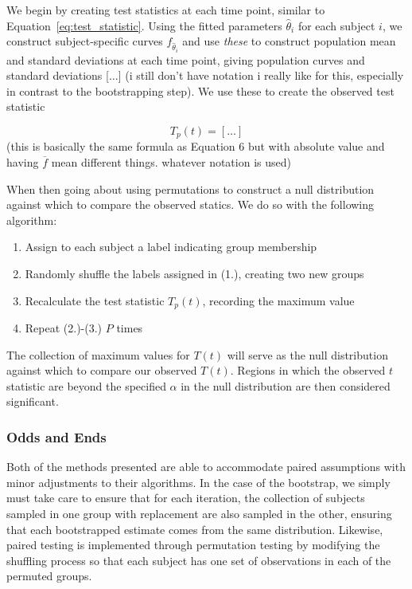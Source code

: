 We begin by creating test statistics at each time point, similar to Equation~\ref{eq:test_statistic}. Using the fitted parameters $\hat{\theta}_i$ for each subject $i$, we construct subject-specific curves $f_{\hat{\theta}_i}$ and use \textit{these} to construct population mean and standard deviations at each time point, giving population curves and standard deviations [$\dots$] (i still don't have notation i really like for this, especially in contrast to the bootstrapping step). We use these to create the observed test statistic

\begin{equation}
T_p(t) = [\dots] 
\end{equation}
(this is basically the same formula as Equation 6 but with absolute value and having $\overline{f}$ mean different things. whatever notation is used)

When then going about using permutations to construct a null distribution against which to compare the observed statics. We do so with the following algorithm:

\begin{enumerate}
\item Assign to each subject a label indicating group membership
\item Randomly shuffle the labels assigned in (1.), creating two new groups 
\item Recalculate the test statistic $T_p(t)$, recording the maximum value
\item Repeat (2.)-(3.) $P$ times
\end{enumerate}

The collection of maximum values for $T(t)$ will serve as the null distribution against which to compare our observed $T(t)$. Regions in which the observed $t$ statistic are beyond the specified $\alpha$ in the null distribution are then considered significant.

\subsubsection{Odds and Ends}

Both of the methods presented are able to accommodate paired assumptions with minor adjustments to their algorithms. In the case of the bootstrap, we simply must take care to ensure that for each iteration, the collection of subjects sampled in one group with replacement are also sampled in the other, ensuring that each bootstrapped estimate comes from the same distribution. Likewise, paired testing is implemented through permutation testing by modifying the shuffling process so that each subject has one set of observations in each of the permuted groups.

